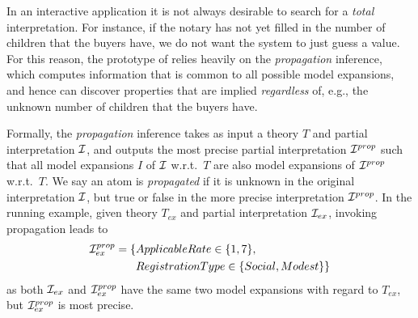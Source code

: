 In an interactive application it is not always desirable to search for a \textit{total }interpretation.
For instance, if the notary has not yet filled in the number of children that the buyers have, we do not want the system to just guess a value. 
For this reason, the prototype of \cite{ruleml/DeryckHVV18} relies heavily on the \emph{propagation} inference, which computes information that is common to all possible model expansions, and hence can discover properties that are implied \emph{regardless} of, e.g., the unknown number of children that the buyers have.

Formally, the \emph{propagation} inference takes as input a theory $T$ and partial interpretation $\mathcal{I}$, and outputs the most precise partial interpretation $\mathcal{I}^{prop}$ such that all model expansions $I$ of $\mathcal{I}$ w.r.t.~$T$ are also model expansions of $\mathcal{I}^{prop}$ w.r.t.~$T$.
We say an atom is \emph{propagated} if it is unknown in the original interpretation $\mathcal{I}$, but true or false in the more precise interpretation $\mathcal{I}^{prop}$.
In the running example, given theory $T_{ex}$ and partial interpretation $\mathcal{I}_{ex}$, invoking propagation leads to
\begin{align*}
\mathcal{I}_{ex}^{prop} = \{ & ApplicableRate\in\{1,7\}, \\
& RegistrationType\in\{Social,Modest\}\}
\end{align*} 
as both $\mathcal{I}_{ex}$ and $\mathcal{I}_{ex}^{prop}$ have the same two model expansions with regard to $T_{ex}$, but $\mathcal{I}_{ex}^{prop}$ is most precise.
\begin{comment}


Finally, given a theory $T$, a formula $\varphi$ is \emph{$T$-implied} by some partial interpretation $\ci$, denoted $\ci \models_T \varphi$, if $\varphi$ holds in all model expansions of $\ci$ w.r.t.~$T$.
Equivalently, $\ci \models_T \varphi$ if $\varphi$ holds in $\ci^{prop}$ obtained by propagating $\ci$ w.r.t.~$T$.
\end{comment}

